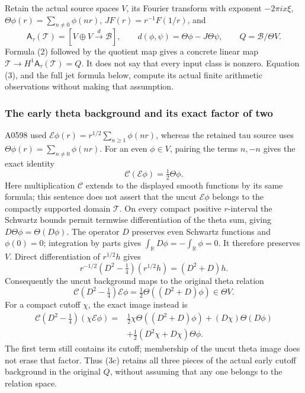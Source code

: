 Retain the actual source spaces \(V\), its Fourier transform with
exponent \(-2\pi i x\xi\), \(\Theta\phi(r)=\sum_{n\ne0}\phi(nr)\),
\(JF(r)=r^{-1}F(1/r)\), and \[
\mathsf A_\tau(\mathcal T)=[V\oplus V\xrightarrow{d}\mathscr B],\qquad
d(\phi,\psi)=\Theta\phi-J\Theta\psi,
\qquad Q=\mathscr B/\Theta V.
\] Formula (2) followed by the quotient map gives a concrete linear map
\(\mathscr T\to H^1\mathsf A_\tau(\mathcal T)=Q\). It does not say that
every input class is nonzero. Equation (3), and the full jet formula
below, compute its actual finite arithmetic observations without making
that assumption.

\subsubsection{The early theta background and its exact factor of
two}\label{TranscriptStage:proof09:the-early-theta-background-and-its-exact-factor-of-two}

A0598 used \(\mathcal E\phi(r)=r^{1/2}\sum_{n\ge1}\phi(nr)\), whereas
the retained tau source uses \(\Theta\phi(r)=\sum_{n\ne0}\phi(nr)\). For
an even \(\phi\in V\), pairing the terms \(n,-n\) gives the exact
identity \[
\mathcal C(\mathcal E\phi)=\tfrac12\Theta\phi.
\tag{3a}
\] Here multiplication \(\mathcal C\) extends to the displayed smooth
functions by its same formula; this sentence does not assert that the
uncut \(\mathcal E\phi\) belongs to the compactly supported domain
\(\mathscr T\). On every compact positive \(r\)-interval the Schwartz
bounds permit termwise differentiation of the theta sum, giving
\(D\Theta\phi=\Theta(D\phi)\). The operator \(D\) preserves even
Schwartz functions and \(\phi(0)=0\); integration by parts gives
\(\int_{\mathbb R} D\phi=-\int_{\mathbb R}\phi=0\). It therefore preserves
\(V\). Direct differentiation of \(r^{1/2}h\) gives \[
r^{-1/2}(D^2-\tfrac14)(r^{1/2}h)=(D^2+D)h.
\] Consequently the uncut background maps to the original theta relation
\[
\mathcal C(D^2-\tfrac14)\mathcal E\phi=\tfrac12\Theta((D^2+D)\phi)\in\Theta V.
\tag{3b}
\] For a compact cutoff \(\chi\), the exact image instead is \[
\begin{aligned}
\mathcal C(D^2-\tfrac14)(\chi\mathcal E\phi)
={}&\tfrac12\chi\Theta((D^2+D)\phi)
+(D\chi)\Theta(D\phi)\\
&+\tfrac12(D^2\chi+D\chi)\Theta\phi.
\end{aligned}
\tag{3c}
\] The first term still contains its cutoff; membership of the uncut
theta image does not erase that factor. Thus (3c) retains all three
pieces of the actual early cutoff background in the original \(Q\),
without assuming that any one belongs to the relation space.

